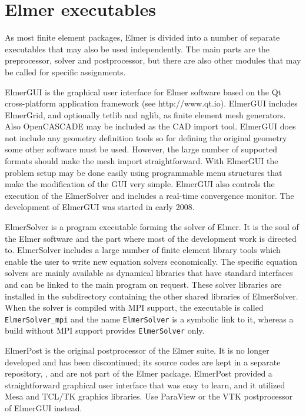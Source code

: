 \section{Elmer executables}

As most finite element packages, Elmer is divided into a number of separate
executables that may also be used independently. The main parts are the preprocessor, solver
and postprocessor, but there are also other modules that may be called for specific assignments. 

\sifbegin
{}
ElmerGUI is the graphical user interface for Elmer software
based on the Qt cross-platform application framework (see http://www.qt.io). 
ElmerGUI includes ElmerGrid, and optionally tetlib and nglib,
as finite element mesh generators. Also OpenCASCADE may be included as the CAD import tool.
ElmerGUI does not include any geometry definition tools so for defining the 
original geometry some other software must be used. However, the large number of supported formats should make
the mesh import straightforward. With ElmerGUI the problem setup may be done easily using programmable 
menu structures that make the modification of the GUI very simple. ElmerGUI also controls the execution of the ElmerSolver and
includes a real-time convergence monitor. The development of ElmerGUI was started in early 2008. 

ElmerSolver is a program executable forming the solver of Elmer. 
It is the soul of the Elmer software and the part where most of the development work is 
directed to. ElmerSolver includes a large number of finite element library tools
which enable the user to write new equation solvers economically. The specific equation
solvers are mainly available as dynamical libraries that have standard interfaces and can
be linked to the main program on request. These solver libraries are installed in the
subdirectory containing the other shared libraries of ElmerSolver.
When the solver is compiled with MPI support, the executable is called
\texttt{ElmerSolver\_mpi} and the name \texttt{ElmerSolver} is a symbolic link to it,
whereas a build without MPI support provides \texttt{ElmerSolver} only.

ElmerPost is the original postprocessor of the Elmer suite. It is no longer developed
and has been discontinued; its source codes are kept in a separate repository,
, and are not part of the Elmer package.
ElmerPost provided a straightforward graphical user interface
that was easy to learn, and it utilized Mesa and TCL/TK graphics libraries.
Use ParaView or the VTK postprocessor of ElmerGUI instead.

